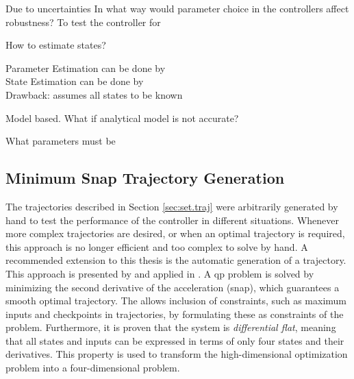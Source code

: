 Due to uncertainties
In what way would parameter choice in the controllers affect robustness?
To test the controller for


How to estimate states?

Parameter Estimation can be done by\\

State Estimation can be done by\\

Drawback: assumes all states to be known

Model based. What if analytical model is not accurate?

What parameters must be 





\subsection{Minimum Snap Trajectory Generation}
The trajectories described in Section \ref{sec:set.traj} were arbitrarily generated by hand to test the performance of the controller in different situations. 
Whenever more complex trajectories are desired, or when an optimal trajectory is required, this approach is no longer efficient and too complex to solve by hand.
A recommended extension to this thesis is the automatic generation of a trajectory. 
This approach is presented by \cite{Mellinger2011} and applied in \cite{Tang2014,Tang2015}. A \acs{qp} problem is solved by minimizing the second derivative of the acceleration (snap), which guarantees a smooth optimal trajectory. The  allows inclusion of constraints, such as maximum inputs and checkpoints in trajectories, by formulating these as constraints of the  problem. Furthermore, it is proven that the system is \textit{differential flat}, meaning that all states and inputs can be expressed in terms of only four states and their derivatives. This property is used to transform the high-dimensional optimization problem into a four-dimensional problem.


